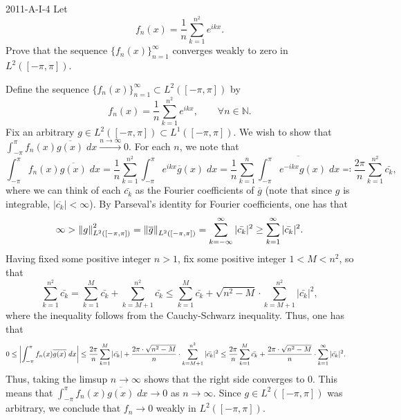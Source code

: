 \documentclass{article}
\begin{document}
	\begin{prb}{2011-A-I-4}
		Let 
		\begin{equation*}
			f_{n}(x) = \frac{1}{n}\sum_{k = 1}^{n^{2}}e^{ikx}. 
		\end{equation*}
		Prove that the sequence $\{f_{n}(x)\}_{n = 1}^{\infty}$ converges weakly to zero in $L^{2}([-\pi, \pi])$. 
	\end{prb}
	Define the sequence $\{f_{n}(x)\}_{n = 1}^{\infty} \subset L^{2}([-\pi, \pi])$ by 
	\begin{equation*}
		f_{n}(x) = \frac{1}{n}\sum_{k = 1}^{n^{2}}e^{ikx}, \qquad \forall n \in \mathbb{N}. 
	\end{equation*}
	Fix an arbitrary $g \in L^{2}([-\pi,\pi]) \subset L^{1}([-\pi, \pi])$. We wish to show that $\int_{-\pi}^{\pi}f_{n}(x)\overline{g(x)}\;dx \xrightarrow{n \to \infty} 0$. For each $n$, we note that 
	\begin{equation*}
		\int_{-\pi}^{\pi}f_{n}(x)\overline{g(x)}\;dx = \frac{1}{n}\sum_{k = 1}^{n^{2}}\int_{-\pi}^{\pi}e^{ikx}\overline{g}(x)\;dx =
		\frac{1}{n}\sum_{k = 1}^{n} \overline{\int_{-\pi}^{\pi}e^{-ikx}g(x)\;dx} \eqqcolon \frac{2\pi}{n}\sum_{k = 1}^{n^{2}}\bar{c_{k}}, 
	\end{equation*}
	where we can think of each $\bar{c_{k}}$ as the Fourier coefficients of $\overline{g}$ (note that since $g$ is integrable, $|\overline{c_{k}}| < \infty$). By Parseval's identity for Fourier coefficients, one has that 
	\begin{equation*}
		\infty > \left\Vert g \right\Vert_{L^{2}([-\pi,\pi])}^{2} = \left\Vert \overline{g} \right\Vert_{L^{2}([-\pi,\pi])} = \sum_{k =-\infty}^{\infty}|\bar{c_{k}}|^{2} \geq \sum_{k = 1}^{\infty}|\bar{c_{k}}|^{2}. 
	\end{equation*}
	Having fixed some positive integer $n > 1$, fix some positive integer $1 < M < n^{2}$, so that 
	\begin{equation*}
		\sum_{k=1}^{n^{2}}\bar{c_{k}} = \sum_{k = 1}^{M}\bar{c_{k}} + \sum_{k = M + 1}^{n^{2}}\bar{c_{k}} \leq \sum_{k = 1}^{M}\bar{c_{k}} + \sqrt{n^{2} - M} \cdot \sum_{k = M + 1}^{n^{2}}|\bar{c_{k}}|^{2}, 
	\end{equation*}
	where the inequality follows from the Cauchy-Schwarz inequality. Thus, one has that 
	\begin{align*}
		\begin{split}
			0 \leq \left| \int_{-\pi}^{\pi}f_{n}(x)\overline{g(x)}\;dx \right| &\leq \frac{2\pi}{n}\sum_{k = 1}^{M}|\bar{c_{k}}| + \frac{2\pi\cdot \sqrt{n^{2} - M}}{n}\cdot \sum_{k = M + 1}^{n^{2}}|\bar{c_{k}}|^{2} \leq \frac{2\pi}{n}\sum_{k = 1}^{M}\bar{c_{k}} + \frac{2\pi\cdot \sqrt{n^{2} - M}}{n}\cdot \sum_{k = 1
			}^{\infty}|\bar{c_{k}}|^{2}. 
		\end{split}
	\end{align*}
	Thus, taking the limsup $n \to \infty$ shows that the right side converges to 0. This means that $\int_{-\pi}^{\pi}f_{n}(x)\overline{g(x)}\;dx \to 0$ as $n \to \infty$. Since $g \in L^{2}([-\pi,\pi])$ was arbitrary, we conclude that $f_{n} \to 0$ weakly in $L^{2}([-\pi, \pi])$. 
	
\end{document}
